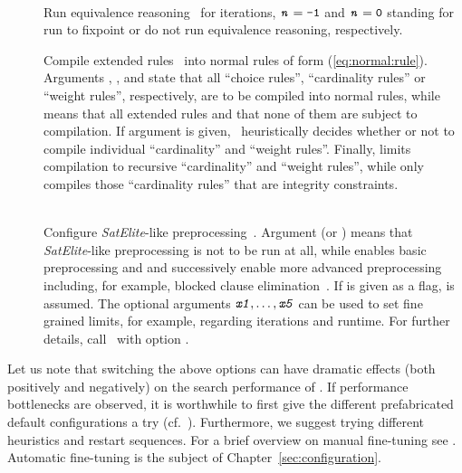 \begin{description}
  \item[]~\\
    Run equivalence reasoning~\cite{gekanesc08a} for  iterations,
    $\texttt{\textit{n}}=\texttt{-1}$ and $\texttt{\textit{n}}=\texttt{0}$ standing for
    run to fixpoint or do not run equivalence reasoning, respectively.
  \item[]
    Compile extended rules~\cite{siniso02a} into normal rules of form (\ref{eq:normal:rule}).
    Arguments ,  , and 
    state that all ``choice rules'', ``cardinality rules'' or ``weight rules'', respectively,
    are to be compiled into normal rules,
    while  means that all extended rules and  that none of them
    are subject to compilation. If argument  is given,
    \clasp\ heuristically decides whether or not to compile individual
    ``cardinality'' and ``weight rules''.
    Finally,  limits compilation to recursive ``cardinality'' and ``weight rules'',
    while  only compiles those ``cardinality rules'' that are integrity constraints.
  \item[]~\\
    Configure \emph{SatElite}-like preprocessing~\cite{eenbie05a}.
    Argument  (or ) means that \emph{SatElite}-like preprocessing is not to be run at all,
    while  enables basic preprocessing and  and  successively enable more
    advanced preprocessing including, for example, blocked clause elimination~\cite{jabihe10a}.
    If  is given as a flag,  is assumed.
    The optional arguments $\texttt{\textit{x1}},\ldots,\texttt{\textit{x5}}$ can be used
    to set fine grained limits, for example, regarding iterations and runtime.
    For further details, call \clasp\ with option .

\end{description}

Let us note that switching the above options can have dramatic effects
(both positively and negatively) on the search performance of \clasp.
If performance bottlenecks are observed, it is worthwhile to first
give the different prefabricated default configurations a try (cf.\ ).
Furthermore, we suggest trying different heuristics and restart sequences.
For a brief overview on manual fine-tuning see \cite{gekasc09b}.
Automatic fine-tuning is the subject of Chapter~\ref{sec:configuration}.


